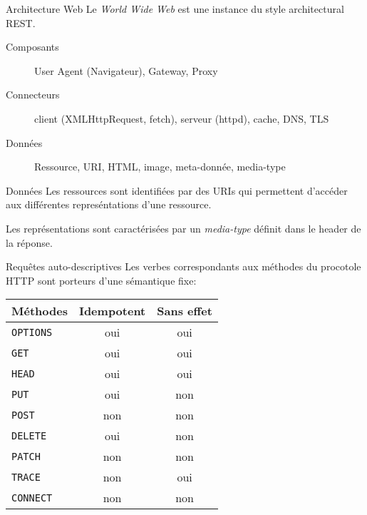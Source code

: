 \documentclass{beamer}
\begin{document}
\begin{frame}{Architecture Web}
  Le \emph{World Wide Web} est une instance du style architectural
  REST.

  \begin{description}
  \item [Composants] User Agent (Navigateur), Gateway, Proxy
  \item [Connecteurs] client (XMLHttpRequest, fetch), serveur (httpd), cache, DNS, TLS
  \item [Données] Ressource, URI, HTML, image, meta-donnée, media-type
  \end{description}
\end{frame}

\begin{frame}{Données}
  Les ressources sont identifiées par des URIs qui permettent
  d'accéder aux différentes represéntations d'une ressource.

  \begin{center}
  \end{center}

  Les représentations sont caractérisées par un \emph{media-type}
  définit dans le header de la réponse.
\end{frame}

\begin{frame}{Requêtes auto-descriptives}
  Les verbes correspondants aux méthodes du procotole HTTP sont
  porteurs d'une sémantique fixe:
  \begin{center}
    \begin{tabular}{lcc}
      Méthodes & Idempotent & Sans effet \\
      \hline
      \verb#OPTIONS# & oui  &  oui \\
      \verb#GET# & oui &  oui \\
      \verb#HEAD# & oui & oui \\
      \verb#PUT# & oui & non \\
      \verb#POST# & non & non \\
      \verb#DELETE# & oui & non \\
      \verb#PATCH# & non & non \\
      \verb#TRACE# & non & oui \\
      \verb#CONNECT# & non & non \\
    \end{tabular}
  \end{center}
\end{frame}
\end{document}
